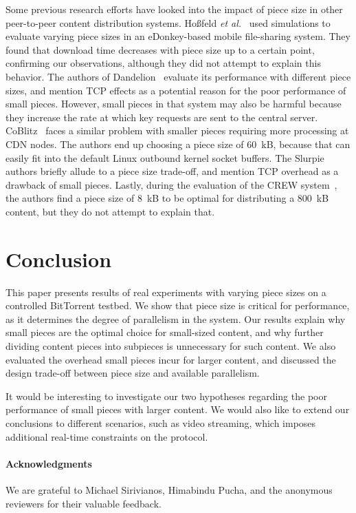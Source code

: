 \documentclass[twocolumn,letterpaper,11pt]{article}
\begin{document}
Some previous research efforts have looked into the impact of piece size in other 
peer-to-peer content distribution systems.
Ho{\ss}feld \textit{et al.}~\cite{hossfeld05} used simulations
to evaluate varying piece sizes in an eDonkey-based mobile file-sharing system. They found that
download time decreases with piece size up to a certain point,
confirming our observations, although they did not attempt to explain this behavior.
The authors of Dandelion~\cite{sirivianos07} evaluate its performance with different piece sizes, and mention
TCP effects as a potential reason for the poor performance of small pieces. However, small
pieces in that system may also be harmful because they increase the rate at which key requests are 
sent to the central server.
CoBlitz~\cite{park06} faces a similar problem with smaller pieces requiring more processing
at CDN nodes. The authors end up choosing a piece size of 60~kB, because that can easily fit into 
the default Linux outbound kernel socket buffers.
The Slurpie~\cite{sherwood04} authors briefly allude to a piece size trade-off, and 
mention TCP overhead as a drawback of small pieces.
Lastly, during the evaluation of the CREW system~\cite{deshpande06},
the authors find a piece size of 8~kB to be optimal for distributing a
800~kB content, but they do not attempt to explain that.

\section{Conclusion}
\label{sec:conclusion}

This paper presents results of real experiments with varying piece sizes on a 
controlled BitTorrent testbed. We show that piece size is critical for performance, 
as it determines the degree of parallelism in the system.
Our results explain why small pieces are the optimal choice for small-sized content,
and why further dividing content pieces into subpieces is unnecessary for such 
content.
We also evaluated the overhead small pieces incur for larger content, and 
discussed the design trade-off between piece size and available parallelism.

It would be interesting
to investigate our two hypotheses regarding the poor performance of small pieces
with larger content.
We would also like to extend our conclusions to different scenarios, such as 
video streaming, which imposes additional real-time constraints on the protocol.

\paragraph{Acknowledgments} 
We are grateful to Michael Sirivianos, Himabindu Pucha, and the anonymous reviewers 
for their valuable feedback.
\end{document}

